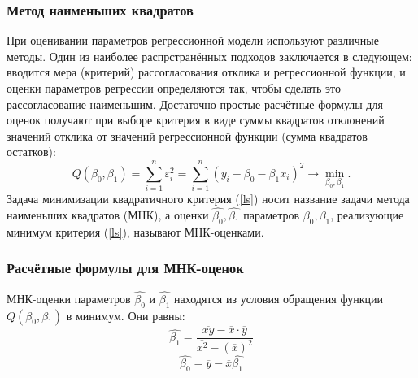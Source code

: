 \subsubsection{Метод наименьших квадратов}
При оценивании параметров регрессионной модели используют различные методы. Один из наиболее распрстранённых подходов заключается в следующем: вводится мера (критерий) рассогласования отклика и регрессионной функции, и оценки параметров регрессии определяются так, чтобы сделать это рассогласование наименьшим. Достаточно простые расчётные формулы для оценок получают при выборе критерия в виде суммы квадратов отклонений значений отклика от значений регрессионной функции (сумма квадратов остатков):
\begin{equation} \label{ls}
Q(\beta_0, \beta_1)=\sum_{i=1}^{n}\varepsilon_i^2=\sum_{i=1}^{n}(y_i-\beta_0-\beta_1x_i)^2 \rightarrow \min_{\beta_0,\beta_1}.
\end{equation}
Задача минимизации квадратичного критерия (\ref{ls}) носит название задачи метода наименьших квадратов (МНК), а оценки $\widehat{\beta_0},\widehat{\beta_1}$ параметров $\beta_0, \beta_1$, реализующие минимум критерия (\ref{ls}), называют МНК-оценками.

\subsubsection{Расчётные формулы для МНК-оценок}
МНК-оценки параметров $\widehat{\beta_0}$ и $\widehat{\beta_1}$ находятся из условия обращения функции $Q(\beta_0, \beta_1)$ в минимум. Они равны:
\begin{equation} \label{beta1}
\widehat{\beta_1}=\frac{\overline{xy}-\overline{x}\cdot\overline{y}}{\overline{x^2}-(\overline{x})^2}
\end{equation}
\begin{equation} \label{beta0}
\widehat{\beta_0}=\overline{y}-\overline{x}\widehat{\beta_1}
\end{equation}

